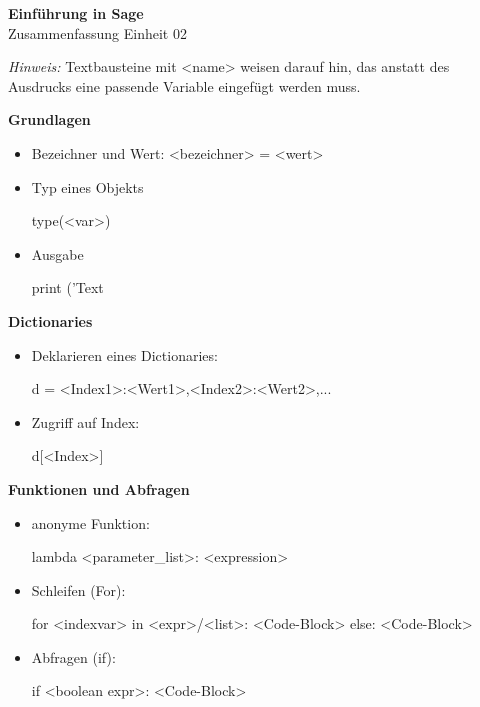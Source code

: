 \documentclass[a4paper,9pt,DIV15,twocolumn]{scrartcl}
\begin{document}
\begin{center}
    \textbf{\LARGE Einführung in Sage}\\
    {\large Zusammenfassung Einheit 02}
\end{center}
\textsl{Hinweis:} Textbausteine mit <name> weisen darauf hin, das anstatt des Ausdrucks eine passende Variable eingefügt werden muss.

\medskip
\textbf{Grundlagen}
\begin{itemize}
    \item Bezeichner und Wert: <bezeichner> = <wert>
    \item Typ eines Objekts
        \begin{sagein}
type(<var>)    
        \end{sagein}
    \item Ausgabe    
        \begin{sagein}
print ('Text %
        \end{sagein}
\end{itemize}



\textbf{Dictionaries}

\begin{itemize}
 \item Deklarieren eines Dictionaries:
\begin{sagein}
d = {<Index1>:<Wert1>,<Index2>:<Wert2>,...}
\end{sagein}
 \item Zugriff auf Index:
\begin{sagein}
d[<Index>]
\end{sagein}
\end{itemize}

\textbf{Funktionen und Abfragen}

\begin{itemize}
 \item anonyme Funktion:
\begin{sagein}
lambda <parameter_list>: <expression> 
\end{sagein}
 \item Schleifen (For):
\begin{sagein}
for <indexvar> in <expr>/<list>:
    <Code-Block>
else:
    <Code-Block>
\end{sagein}
 \item Abfragen (if):
\begin{sagein}
if <boolean expr>:
    <Code-Block>
\end{sagein}

\end{itemize}
\end{document}
